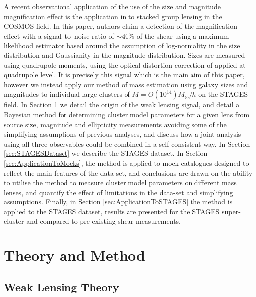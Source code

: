 \documentclass[useAMS,usenatbib,times,letter,amssymb]{mn2e}
\begin{document}
A recent observational application of the use of the size and magnitude magnification effect is the application in \cite{Schmidt:2012p1106} to stacked group lensing in the COSMOS field. In this paper, authors claim a detection of the magnification effect with a signal--to--noise ratio of $\sim 40\%$ of the shear using a maximum-likelihood estimator based around the assumption of log-normality in the size distribution and Gaussianity in the magnitude distribution. Sizes are measured using quadrupole moments, using the optical-distortion correction of \cite{Rhodes:2000p2068} applied at quadrupole level. It is precisely this signal which is the main aim of this paper, however we instead apply our method of mass estimation using galaxy sizes and magnitudes to individual large clusters of $M=  O(10^{14}) M_{\odot}/h$ on the STAGES field. In Section \ref{sec:TheoryAndMethod} we detail the origin of the weak lensing signal, and detail a Bayesian method for determining cluster model parameters for a given lens from source size, magnitude and ellipticity measurements avoiding some of the simplifying assumptions of previous analyses, and discuss how a joint analysis using all three observables could be combined in a self-consistent way. In Section \ref{sec:STAGESDataset} we describe the STAGES dataset. In Section \ref{sec:ApplicationToMocks}, the method is applied to mock catalogues designed to reflect the main features of the data-set, and conclusions are drawn on the ability to utilise the method to measure cluster model parameters on different mass lenses, and quantify the effect of limitations in the data-set and simplifying assumptions. Finally, in Section \ref{sec:ApplicationToSTAGES} the method is applied to the STAGES dataset, results are presented for the STAGES super-cluster and compared to pre-existing shear measurements. 

\section{Theory and Method}\label{sec:TheoryAndMethod}
\subsection{Weak Lensing Theory}
\end{document}
